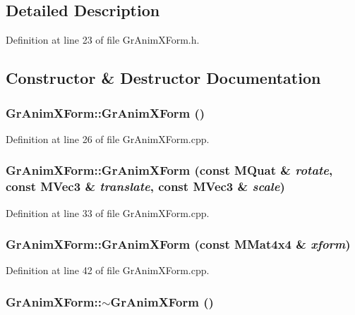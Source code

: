 \subsection{Detailed Description}


Definition at line 23 of file GrAnimXForm.h.

\subsection{Constructor \& Destructor Documentation}
\hypertarget{class_gr_anim_x_form_f72fc165f23278a120e67a83758e17c6}{
\subsubsection[{GrAnimXForm}]{\setlength{\rightskip}{0pt plus 5cm}GrAnimXForm::GrAnimXForm ()}}
\label{class_gr_anim_x_form_f72fc165f23278a120e67a83758e17c6}




Definition at line 26 of file GrAnimXForm.cpp.\hypertarget{class_gr_anim_x_form_cc12f6a12d1779e8052e0c270136924d}{
\subsubsection[{GrAnimXForm}]{\setlength{\rightskip}{0pt plus 5cm}GrAnimXForm::GrAnimXForm (const {\bf MQuat} \& {\em rotate}, \/  const {\bf MVec3} \& {\em translate}, \/  const {\bf MVec3} \& {\em scale})}}
\label{class_gr_anim_x_form_cc12f6a12d1779e8052e0c270136924d}




Definition at line 33 of file GrAnimXForm.cpp.\hypertarget{class_gr_anim_x_form_6c46438d6a672eb6d7d32f124ed479a1}{
\subsubsection[{GrAnimXForm}]{\setlength{\rightskip}{0pt plus 5cm}GrAnimXForm::GrAnimXForm (const {\bf MMat4x4} \& {\em xform})}}
\label{class_gr_anim_x_form_6c46438d6a672eb6d7d32f124ed479a1}




Definition at line 42 of file GrAnimXForm.cpp.\hypertarget{class_gr_anim_x_form_caf2e3e62973312c7cf46d9afa85e76c}{
\subsubsection[{$\sim$GrAnimXForm}]{\setlength{\rightskip}{0pt plus 5cm}GrAnimXForm::$\sim$GrAnimXForm ()}}
\label{class_gr_anim_x_form_caf2e3e62973312c7cf46d9afa85e76c}




